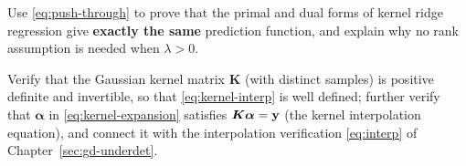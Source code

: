 \begin{exercise}\label{ex:kernel-dual}
Use \eqref{eq:push-through} to prove that the primal and dual forms of kernel ridge regression give \textbf{exactly the same} prediction function, and explain why no rank assumption is needed when $\lambda > 0$.
\end{exercise}

\begin{exercise}\label{ex:kernel-interp}
Verify that the Gaussian kernel matrix $\bm{K}$ (with distinct samples) is positive definite and invertible, so that \eqref{eq:kernel-interp} is well defined; further verify that $\bm{\alpha}$ in \eqref{eq:kernel-expansion} satisfies $\bm{K}\bm{\alpha} = \mathbf{y}$ (the kernel interpolation equation), and connect it with the interpolation verification \eqref{eq:interp} of Chapter~\ref{sec:gd-underdet}.
\end{exercise}
